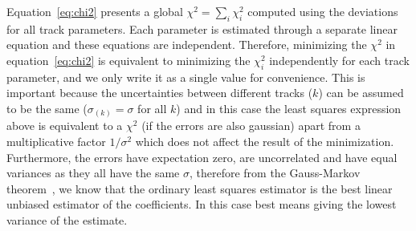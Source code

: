 \documentclass[10pt,a4paper]{report}
\begin{document}
Equation~\ref{eq:chi2} presents a global $\chi^2 = \sum_i \chi^2_i$ computed using the deviations for all track parameters. Each parameter is estimated through a separate linear equation and these equations are independent. Therefore, minimizing the $\chi^2$ in equation~\ref{eq:chi2} is equivalent to minimizing the $\chi^2_i$ independently for each track parameter, and we only write it as a single value for convenience. This is important because the uncertainties between different tracks ($k$) can be assumed to be the same ($\sigma_{(k)} = \sigma$ for all $k$) and in this case the least squares expression above is equivalent to a $\chi^2$ (if the errors are also gaussian) apart from a multiplicative factor $1/\sigma^2$ which does not affect the result of the minimization. Furthermore, the errors have expectation zero, are uncorrelated and have equal variances as they all have the same $\sigma$, therefore from the Gauss-Markov theorem~\cite{GaussMarkov}, we know that the ordinary least squares estimator is the best linear unbiased estimator of the coefficients. In this case best means giving the lowest variance of the estimate.
\end{document}
